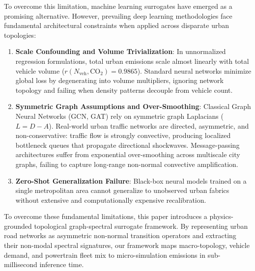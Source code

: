 \documentclass[journal]{IEEEtran}
\begin{document}
To overcome this limitation, machine learning surrogates have emerged as a promising alternative. However, prevailing deep learning methodologies face fundamental architectural constraints when applied across disparate urban topologies:
\begin{enumerate}
    \item \textbf{Scale Confounding and Volume Trivialization}: In unnormalized regression formulations, total urban emissions scale almost linearly with total vehicle volume ($r(N_{\text{veh}}, \text{CO}_2) = 0.9865$). Standard neural networks minimize global loss by degenerating into volume multipliers, ignoring network topology and failing when density patterns decouple from vehicle count.
    \item \textbf{Symmetric Graph Assumptions and Over-Smoothing}: Classical Graph Neural Networks (GCN, GAT) \cite{Kipf2017, Velickovic2018} rely on symmetric graph Laplacians ($L = D - A$). Real-world urban traffic networks are directed, asymmetric, and non-conservative: traffic flow is strongly convective, producing localized bottleneck queues that propagate directional shockwaves. Message-passing architectures suffer from exponential over-smoothing across multiscale city graphs, failing to capture long-range non-normal convective amplification.
    \item \textbf{Zero-Shot Generalization Failure}: Black-box neural models trained on a single metropolitan area cannot generalize to unobserved urban fabrics without extensive and computationally expensive recalibration.
\end{enumerate}

To overcome these fundamental limitations, this paper introduces a physics-grounded topological graph-spectral surrogate framework. By representing urban road networks as asymmetric non-normal transition operators and extracting their non-modal spectral signatures, our framework maps macro-topology, vehicle demand, and powertrain fleet mix to micro-simulation emissions in sub-millisecond inference time.
\end{document}
